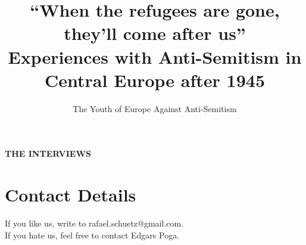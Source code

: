\documentclass{book}
\title{``When the refugees are gone, they'll come after us''\\ Experiences with Anti-Semitism in Central Europe after 1945}
\author{The Youth of Europe Against Anti-Semitism}
\date{}
\begin{document}
	\setlength{\parindent}{0pt}
	\setlength{\parskip}{1em}
\maketitle 
\thispagestyle{empty}
\tableofcontents

\newpage
\thispagestyle{empty}
\vspace*{15em}
 \textbf{\Huge{THE INTERVIEWS}} 




















\nocite{*}
\newpage
\section{Contact Details}
If you like us, write to rafael.schuetz@gmail.com.\\ If you hate us, feel free to contact Edgars Poga.
\end{document}
